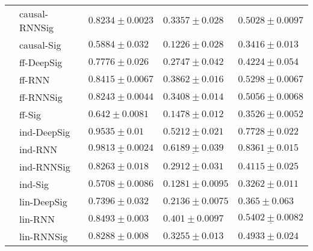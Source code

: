 \begin{tabular}{lllll}
       & causal-RNNSig &                           $ 0.8234 \pm 0.0023 $ &                            $ 0.3357 \pm 0.028 $ &                          $ 0.5028 \pm 0.0097 $ \\
       & causal-Sig &                            $ 0.5884 \pm 0.032 $ &                            $ 0.1226 \pm 0.028 $ &                           $ 0.3416 \pm 0.013 $ \\
       & ff-DeepSig &                            $ 0.7776 \pm 0.026 $ &                            $ 0.2747 \pm 0.042 $ &                           $ 0.4224 \pm 0.054 $ \\
       & ff-RNN &                           $ 0.8415 \pm 0.0067 $ &                            $ 0.3862 \pm 0.016 $ &                          $ 0.5298 \pm 0.0067 $ \\
       & ff-RNNSig &                           $ 0.8243 \pm 0.0044 $ &                            $ 0.3408 \pm 0.014 $ &                          $ 0.5056 \pm 0.0068 $ \\
       & ff-Sig &                            $ 0.642 \pm 0.0081 $ &                            $ 0.1478 \pm 0.012 $ &                          $ 0.3526 \pm 0.0052 $ \\
       & ind-DeepSig &                 $  \mathbf{ 0.9535 \pm 0.01 } $ &                $  \mathbf{ 0.5212 \pm 0.021 } $ &               $  \mathbf{ 0.7728 \pm 0.022 } $ \\
       & ind-RNN &  $  \mathbf{ \underline{ 0.9813 \pm 0.0024 }} $ &   $  \mathbf{ \underline{ 0.6189 \pm 0.039 }} $ &  $  \mathbf{ \underline{ 0.8361 \pm 0.015 }} $ \\
       & ind-RNNSig &                            $ 0.8263 \pm 0.018 $ &                            $ 0.2912 \pm 0.031 $ &                           $ 0.4115 \pm 0.025 $ \\
       & ind-Sig &                           $ 0.5708 \pm 0.0086 $ &                           $ 0.1281 \pm 0.0095 $ &                           $ 0.3262 \pm 0.011 $ \\
       & lin-DeepSig &                            $ 0.7396 \pm 0.032 $ &                           $ 0.2136 \pm 0.0075 $ &                            $ 0.365 \pm 0.063 $ \\
       & lin-RNN &                            $ 0.8493 \pm 0.003 $ &                            $ 0.401 \pm 0.0097 $ &           $  \underline{ 0.5402 \pm 0.0082 } $ \\
       & lin-RNNSig &                            $ 0.8288 \pm 0.008 $ &                            $ 0.3255 \pm 0.013 $ &                           $ 0.4933 \pm 0.024 $ \\

\end{tabular}
